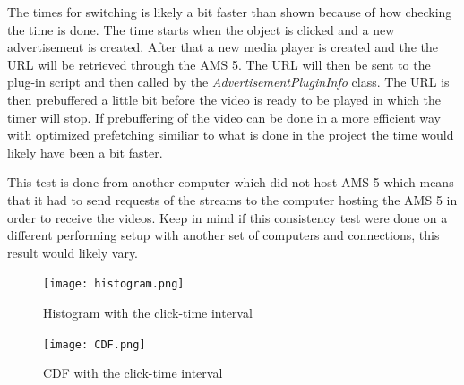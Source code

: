The times for switching is likely a bit faster than shown because of how checking the time is done. The time starts when the object is clicked and a new advertisement is created. After that a new media player is created and the the URL will be retrieved through the AMS 5. The URL will then be sent to the plug-in script and then called by the \textit{AdvertisementPluginInfo} class. The URL is then prebuffered a little bit before the video is ready to be played in which the timer will stop. If prebuffering of the video can be done in a more efficient way with optimized prefetching similiar to what is done in the project \cite{optimizedstreaming} the time would likely have been a bit faster.

This test is done from another computer which did not host AMS 5 which means that it had to send requests of the streams to the computer hosting the AMS 5 in order to receive the videos. Keep in mind if this consistency test were done on a different performing setup with another set of computers and connections, this result would likely vary.

\newpage

\begin{figure}[ht!]
\begin{center}
	\texttt{[image: histogram.png]}
	\caption{Histogram with the click-time interval}
	\label{fig:histogram}
\end{center}
\end{figure}

\begin{figure}[ht!]
\begin{center}
	\texttt{[image: CDF.png]}
	\caption{CDF with the click-time interval}
	\label{fig:cdf}
\end{center}
\end{figure}